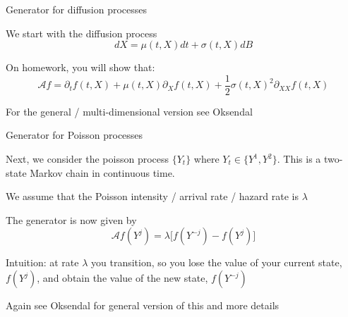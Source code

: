 \documentclass[11pt, aspectratio=169]{beamer}
\newenvironment{witemize}{\itemize\addtolength{\itemsep}{10pt}}{\enditemize}
\begin{document}
\begin{frame}{Generator for diffusion processes}

\begin{witemize}
\item We start with the diffusion process
\begin{equation*}
	dX = \mu(t, X) dt + \sigma (t, X) dB
\end{equation*}

\item On homework, you will show that:
\begin{equation*}
	\mathcal A f = \partial_t f(t, X) + \mu(t, X) \partial_X f(t, X) + \frac{1}{2} \sigma(t, X)^2 \partial_{XX} f(t, X)
\end{equation*}

\item For the general / multi-dimensional version see Oksendal
\end{witemize}
\end{frame}


\begin{frame}{Generator for Poisson processes}
\begin{witemize}
\item Next, we consider the poisson process $\{ Y_t \}$ where $Y_t \in \{ Y^1, Y^2 \}$. This is a two-state Markov chain in continuous time.

\item We assume that the Poisson intensity / arrival rate / hazard rate is $\lambda$

\item The generator is now given by
\begin{equation*}
	\mathcal A f (Y^j) = \lambda \Big[ f( Y^{-j} ) - f (Y^j) \Big]
\end{equation*}

\item Intuition: at rate $\lambda$ you transition, so you lose the value of your current state, $f(Y^j)$, and obtain the value of the new state, $f(Y^{-j})$

\item Again see Oksendal for general version of this and more details
\end{witemize}
\end{frame}
\end{document}
